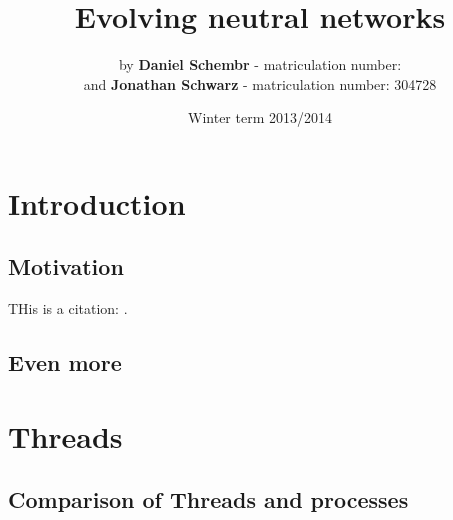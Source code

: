 \documentclass[10pt,a4paper,DIV=11]{scrreprt}
\title
{
    Evolving neutral networks\\
}
\author
{
    by \textbf{Daniel Schembr} - matriculation number:  \\
    and \textbf{Jonathan Schwarz} - matriculation number: 304728
}
\date
{
    Winter term 2013/2014
}
\begin{document}

\maketitle
\thispagestyle{empty}
\newpage
{\large\tableofcontents}
\newpage
\chapter{Introduction}
\section{Motivation}
THis is a citation: \cite{EMB}. 
\section{Even more}

\chapter{Threads}
\section{Comparison of Threads and processes}
\end{document}
